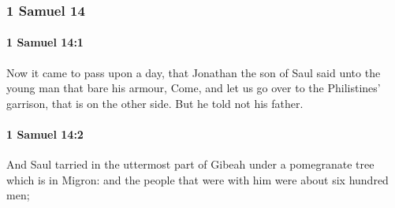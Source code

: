 	\subsubsection{1 Samuel 14} %
		\label{1SAMUEL-14}

		\paragraph{1 Samuel 14:1} %
			\label{1SAMUEL-14-1}

			Now it came to pass upon a day, that Jonathan the son of Saul said unto the young man that bare his armour, Come, and let us go over to the Philistines’ garrison, that is on the other side. But he told not his father.


		\paragraph{1 Samuel 14:2} %
			\label{1SAMUEL-14-2}

			And Saul tarried in the uttermost part of Gibeah under a pomegranate tree which is in Migron: and the people that were with him were about six hundred men;

